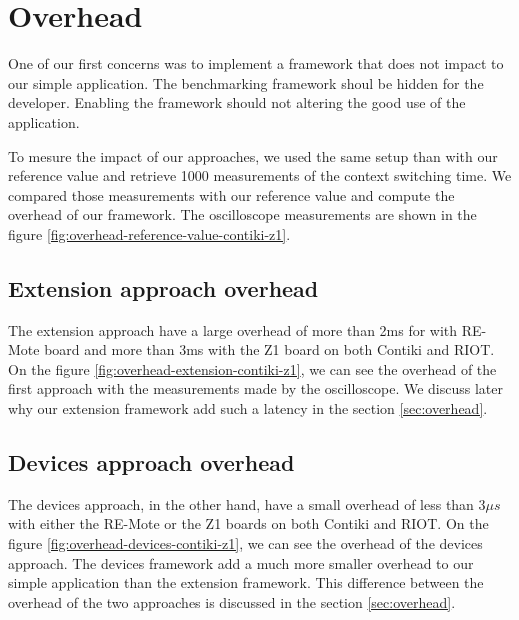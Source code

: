 \section{Overhead}

One of our first concerns was to implement a framework that does not impact to our simple application.
The benchmarking framework shoul be hidden for the developer.
Enabling the framework should not altering the good use of the application.

To mesure the impact of our approaches, we used the same setup than with our reference value and retrieve 1000 measurements of the context switching time.
We compared those measurements with our reference value and compute the overhead of our framework.
The oscilloscope measurements are shown in the figure \ref{fig:overhead-reference-value-contiki-z1}.

\subsection{Extension approach overhead}

The extension approach have a large overhead of more than 2ms for with RE-Mote board and more than 3ms with the Z1 board on both Contiki and RIOT.
On the figure \ref{fig:overhead-extension-contiki-z1}, we can see the overhead of the first approach with the measurements made by the oscilloscope.
We discuss later why our extension framework add such a latency in the section \ref{sec:overhead}.

\subsection{Devices approach overhead}

The devices approach, in the other hand, have a small overhead of less than $3\mu s$ with either the RE-Mote or the Z1 boards on both Contiki and RIOT.
On the figure \ref{fig:overhead-devices-contiki-z1}, we can see the overhead of the devices approach.
The devices framework add a much more smaller overhead to our simple application than the extension framework.
This difference between the overhead of the two approaches is discussed in the section \ref{sec:overhead}.

